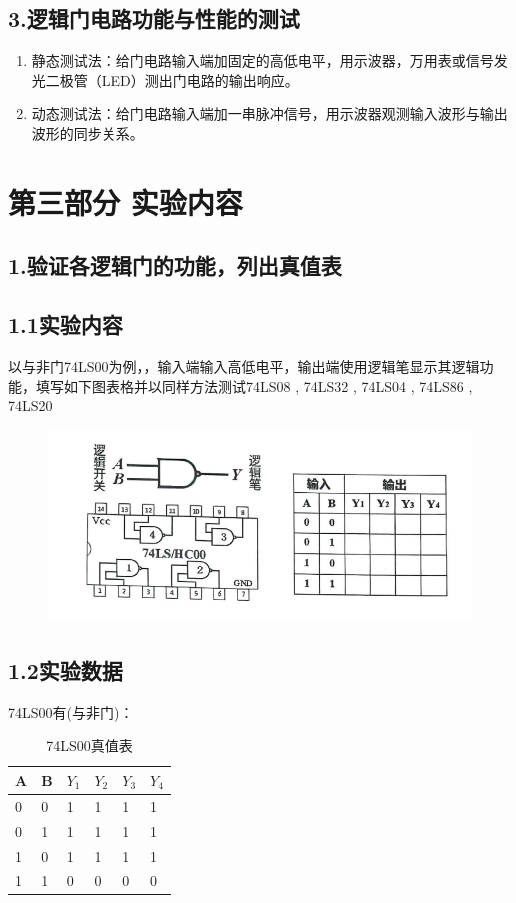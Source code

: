 \documentclass{ctexart}
\begin{document}
    \subsection*{3.逻辑门电路功能与性能的测试}
    \begin{enumerate}[(1)]
        \item 静态测试法：给门电路输入端加固定的高低电平，用示波器，万用表或信号发光二极管（LED）测出门电路的输出响应。
        \item 动态测试法：给门电路输入端加一串脉冲信号，用示波器观测输入波形与输出波形的同步关系。
    \end{enumerate}
    \section*{第三部分 \quad 实验内容}
    \subsection*{1.验证各逻辑门的功能，列出真值表}
    \subsection*{1.1实验内容}
    以与非门74LS00为例，，输入端输入高低电平，输出端使用逻辑笔显示其逻辑功能，填写如下图表格并以同样方法测试74LS08 , 74LS32 , 74LS04 , 74LS86 , 74LS20
    \begin{figure}[htbp]
        \centering
        \includegraphics[width=17cm]{3.1.1.png}
    \end{figure}
    \subsection*{1.2实验数据}
    74LS00有(与非门)：
     \begin{table}[!ht]
       \centering
       \caption{74LS00真值表}
       \begin{tabular}{|l|l|l|l|l|l|}
       \hline
        A & B & $Y_1$ & $Y_2$ & $Y_3$ & $Y_4$  \\ \hline
        0 & 0 & 1 & 1 & 1 & 1  \\ \hline
        0 & 1 & 1 & 1 & 1 & 1  \\ \hline
        1 & 0 & 1 & 1 & 1 & 1  \\ \hline
        1 & 1 & 0 & 0 & 0 & 0  \\ \hline
      \end{tabular}
    \end{table}
\end{document}
